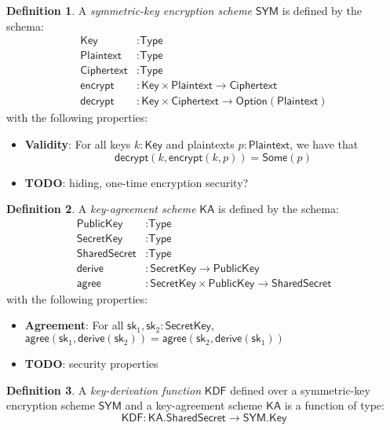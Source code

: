 \documentclass[a4paper]{article}
\newcommand{\TODO}[1]{{\color{red}\textbf{TODO}}: #1}
\theoremstyle{definition}
\newtheorem{definition}{Definition}[subsection]
\newcommand{\Ciphertext}{{\textsf{Ciphertext}}}
\newcommand{\KA}{{\textsf{KA}}}
\newcommand{\KDF}{{\textsf{KDF}}}
\newcommand{\Key}{{\textsf{Key}}}
\newcommand{\Option}{{\textsf{Option}}}
\newcommand{\Plaintext}{{\textsf{Plaintext}}}
\newcommand{\PublicKey}{{\textsf{PublicKey}}}
\newcommand{\SYM}{{\textsf{SYM}}}
\newcommand{\SecretKey}{{\textsf{SecretKey}}}
\newcommand{\SharedSecret}{{\textsf{SharedSecret}}}
\newcommand{\Some}{{\textsf{Some}}}
\newcommand{\Type}{{\textsf{Type}}}
\newcommand{\agree}{{\textsf{agree}}}
\newcommand{\decrypt}{{\textsf{decrypt}}}
\newcommand{\derive}{{\textsf{derive}}}
\newcommand{\encrypt}{{\textsf{encrypt}}}
\newcommand{\sk}{{\textsf{sk}}}
\begin{document}
\begin{definition}
A \emph{symmetric-key encryption scheme} $\SYM$ is defined by the schema:
\begin{align*}
    \Key &: \Type \\
    \Plaintext &: \Type \\
    \Ciphertext &: \Type \\
    \encrypt &: \Key \times \Plaintext \to \Ciphertext \\
    \decrypt &: \Key \times \Ciphertext \to \Option(\Plaintext)
\end{align*}
with the following properties:

\begin{itemize}
    \item \textbf{Validity}: For all keys $k : \Key$ and plaintexts $p : \Plaintext$, we have that
        \[\decrypt(k, \encrypt(k, p)) = \Some(p)\]
    \item \TODO{hiding, one-time encryption security?}
\end{itemize}
\end{definition}

\begin{definition}
    A \emph{key-agreement scheme} $\KA$ is defined by the schema:
    \begin{align*}
        \PublicKey    &: \Type \\
        \SecretKey    &: \Type \\
        \SharedSecret &: \Type \\
        \derive       &: \SecretKey \to \PublicKey \\
        \agree        &: \SecretKey \times \PublicKey \to \SharedSecret
    \end{align*}
    with the following properties:

    \begin{itemize}
        \item \textbf{Agreement}: For all $\sk_1, \sk_2 : \SecretKey$, $\agree(\sk_1, \derive(\sk_2)) = \agree(\sk_2, \derive(\sk_1))$
        \item \TODO{security properties}
    \end{itemize}
\end{definition}

\begin{definition}
    A \emph{key-derivation function} $\KDF$ defined over a symmetric-key encryption scheme $\SYM$ and a key-agreement scheme $\KA$ is a function of type:
    \[\KDF : \KA.\SharedSecret \to \SYM.\Key\]
\end{definition}
\end{document}
